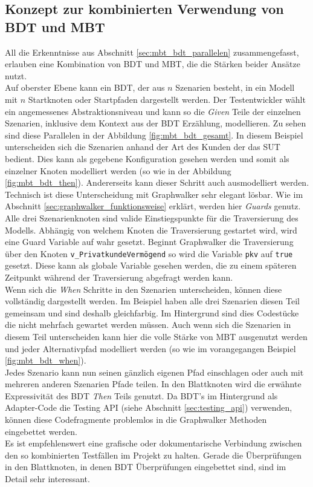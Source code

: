 \subsection{Konzept zur kombinierten Verwendung von BDT und MBT}
All die Erkenntnisse aus Abschnitt \ref{sec:mbt_bdt_parallelen} zusammengefasst, erlauben eine Kombination von \Gls{BDT} und \Gls{MBT}, die die Stärken beider Ansätze nutzt.\\
Auf oberster Ebene kann ein \Gls{BDT}, der aus $n$ Szenarien besteht, in ein Modell mit $n$ Startknoten oder Startpfaden dargestellt werden. Der Testentwickler wählt ein angemessenes Abstraktionsniveau und kann so die \textit{Given} Teile der einzelnen Szenarien, inklusive dem Kontext aus der \Gls{BDT} Erzählung, modellieren. Zu sehen sind diese Parallelen in der Abbildung \ref{fig:mbt_bdt_gesamt}. In diesem Beispiel unterscheiden sich die Szenarien anhand der Art des Kunden der das \Gls{SUT} bedient. Dies kann als gegebene Konfiguration gesehen werden und somit als einzelner Knoten modelliert werden (so wie in der Abbildung \ref{fig:mbt_bdt_then}). Andererseits kann dieser Schritt auch ausmodelliert werden. Technisch ist diese Unterscheidung mit Graphwalker sehr elegant lösbar. Wie im Abschnitt \ref{sec:graphwalker_funktionsweise}  erklärt, werden hier \textit{Guards} genutz. Alle drei Szenarienknoten sind valide Einstiegspunkte für die Traversierung des Modells. Abhängig von welchem Knoten die Traversierung gestartet wird, wird eine Guard Variable auf wahr gesetzt. Beginnt Graphwalker die Traversierung über den Knoten \texttt{v\_PrivatkundeVermögend} so wird die Variable \texttt{pkv} auf \texttt{true} gesetzt. Diese kann als globale Variable gesehen werden, die zu einem späteren Zeitpunkt während der Traversierung abgefragt werden kann.\\
Wenn sich die \textit{When} Schritte in den Szenarien unterscheiden, können diese vollständig dargestellt werden. Im Beispiel haben alle drei Szenarien diesen Teil gemeinsam und sind deshalb gleichfarbig. Im Hintergrund sind dies Codestücke die nicht mehrfach gewartet werden müssen. Auch wenn sich die Szenarien in diesem Teil unterscheiden kann hier die volle Stärke von \Gls{MBT} ausgenutzt werden und jeder Alternativpfad modelliert werden (so wie im vorangegangen Beispiel \ref{fig:mbt_bdt_when}).\\
Jedes Szenario kann nun seinen gänzlich eigenen Pfad einschlagen oder auch mit mehreren anderen Szenarien Pfade teilen. In den Blattknoten wird die erwähnte Expressivität des \Gls{BDT} \textit{Then} Teils genutzt. Da \Gls{BDT}'s im Hintergrund als Adapter-Code die Testing API (siehe Abschnitt \ref{sec:testing_api}) verwenden, können diese Codefragmente problemlos in die Graphwalker Methoden eingebettet werden.\\
Es ist empfehlenswert eine grafische oder dokumentarische Verbindung zwischen den so kombinierten Testfällen im Projekt zu halten. Gerade die Überprüfungen in den Blattknoten, in denen \Gls{BDT} Überprüfungen eingebettet sind, sind im Detail sehr interessant.


